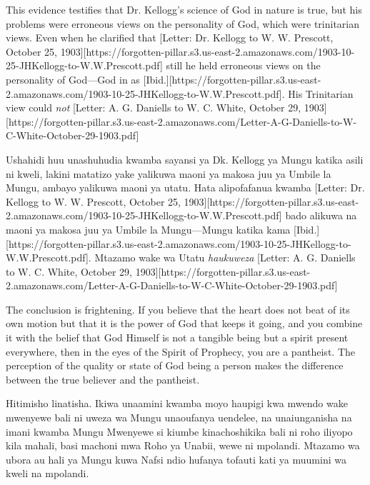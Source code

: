 This evidence testifies that Dr. Kellogg's science of God in nature is true, but his problems were erroneous views on the personality of God, which were trinitarian views. Even when he clarified that [Letter: Dr. Kellogg to W. W. Prescott, October 25, 1903][https://forgotten-pillar.s3.us-east-2.amazonaws.com/1903-10-25-JHKellogg-to-W.W.Prescott.pdf] still he held erroneous views on the personality of God—God in  as [Ibid.][https://forgotten-pillar.s3.us-east-2.amazonaws.com/1903-10-25-JHKellogg-to-W.W.Prescott.pdf]. His Trinitarian view could \textit{not} [Letter: A. G. Daniells to W. C. White, October 29, 1903][https://forgotten-pillar.s3.us-east-2.amazonaws.com/Letter-A-G-Daniells-to-W-C-White-October-29-1903.pdf]


Ushahidi huu unashuhudia kwamba sayansi ya Dk. Kellogg ya Mungu katika asili ni kweli, lakini matatizo yake yalikuwa maoni ya makosa juu ya Umbile la Mungu, ambayo yalikuwa maoni ya utatu. Hata alipofafanua kwamba [Letter: Dr. Kellogg to W. W. Prescott, October 25, 1903][https://forgotten-pillar.s3.us-east-2.amazonaws.com/1903-10-25-JHKellogg-to-W.W.Prescott.pdf] bado alikuwa na maoni ya makosa juu ya Umbile la Mungu—Mungu katika  kama [Ibid.][https://forgotten-pillar.s3.us-east-2.amazonaws.com/1903-10-25-JHKellogg-to-W.W.Prescott.pdf]. Mtazamo wake wa Utatu \textit{haukuweza} [Letter: A. G. Daniells to W. C. White, October 29, 1903][https://forgotten-pillar.s3.us-east-2.amazonaws.com/Letter-A-G-Daniells-to-W-C-White-October-29-1903.pdf]


The conclusion is frightening. If you believe that the heart does not beat of its own motion but that it is the power of God that keeps it going, and you combine it with the belief that God Himself is not a tangible being but a spirit present everywhere, then in the eyes of the Spirit of Prophecy, you are a pantheist. The perception of the quality or state of God being a person makes the difference between the true believer and the pantheist.


Hitimisho linatisha. Ikiwa unaamini kwamba moyo haupigi kwa mwendo wake mwenyewe bali ni uweza wa Mungu unaoufanya uendelee, na unaiunganisha na imani kwamba Mungu Mwenyewe si kiumbe kinachoshikika bali ni roho iliyopo kila mahali, basi machoni mwa Roho ya Unabii, wewe ni mpolandi. Mtazamo wa ubora au hali ya Mungu kuwa Nafsi ndio hufanya tofauti kati ya muumini wa kweli na mpolandi.






